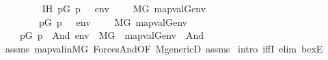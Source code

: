 \begin{isabellebody}
\ \ \ \ \isanewline
\ \ \ \ IH{\isacharcolon}{\kern0pt}\ {\isachardoublequoteopen}{\isacharparenleft}{\kern0pt}{\isasymexists}p{\isasymin}G{\isachardot}{\kern0pt}\ p\ {\isasymtturnstile}\ {\isasymphi}\ env{\isacharparenright}{\kern0pt}\ \ {\isasymlongleftrightarrow}\ \ \ M{\isacharbrackleft}{\kern0pt}G{\isacharbrackright}{\kern0pt}{\isacharcomma}{\kern0pt}\ map{\isacharparenleft}{\kern0pt}val{\isacharparenleft}{\kern0pt}G{\isacharparenright}{\kern0pt}{\isacharcomma}{\kern0pt}env{\isacharparenright}{\kern0pt}\ {\isasymTurnstile}\ {\isasymphi}{\isachardoublequoteclose}\isanewline
\ \ \ \ \ \ \ \ {\isachardoublequoteopen}{\isacharparenleft}{\kern0pt}{\isasymexists}p{\isasymin}G{\isachardot}{\kern0pt}\ p\ {\isasymtturnstile}\ {\isasympsi}\ env{\isacharparenright}{\kern0pt}\ \ {\isasymlongleftrightarrow}\ \ \ M{\isacharbrackleft}{\kern0pt}G{\isacharbrackright}{\kern0pt}{\isacharcomma}{\kern0pt}\ map{\isacharparenleft}{\kern0pt}val{\isacharparenleft}{\kern0pt}G{\isacharparenright}{\kern0pt}{\isacharcomma}{\kern0pt}env{\isacharparenright}{\kern0pt}\ {\isasymTurnstile}\ {\isasympsi}{\isachardoublequoteclose}\isanewline
\ \ \isanewline
\ \ \ \ {\isachardoublequoteopen}{\isacharparenleft}{\kern0pt}{\isasymexists}p{\isasymin}G{\isachardot}{\kern0pt}\ {\isacharparenleft}{\kern0pt}p\ {\isasymtturnstile}\ And{\isacharparenleft}{\kern0pt}{\isasymphi}{\isacharcomma}{\kern0pt}{\isasympsi}{\isacharparenright}{\kern0pt}\ env{\isacharparenright}{\kern0pt}{\isacharparenright}{\kern0pt}\ {\isasymlongleftrightarrow}\ M{\isacharbrackleft}{\kern0pt}G{\isacharbrackright}{\kern0pt}\ {\isacharcomma}{\kern0pt}\ map{\isacharparenleft}{\kern0pt}val{\isacharparenleft}{\kern0pt}G{\isacharparenright}{\kern0pt}{\isacharcomma}{\kern0pt}env{\isacharparenright}{\kern0pt}\ {\isasymTurnstile}\ And{\isacharparenleft}{\kern0pt}{\isasymphi}{\isacharcomma}{\kern0pt}{\isasympsi}{\isacharparenright}{\kern0pt}{\isachardoublequoteclose}\isanewline
%
\isadelimproof
\ \ %
\endisadelimproof
%
\isatagproof
{}\isamarkupfalse%
\ assms\ map{\isacharunderscore}{\kern0pt}val{\isacharunderscore}{\kern0pt}in{\isacharunderscore}{\kern0pt}MG\ Forces{\isacharunderscore}{\kern0pt}And{\isacharbrackleft}{\kern0pt}OF\ M{\isacharunderscore}{\kern0pt}genericD\ assms{\isacharparenleft}{\kern0pt}{}{\isacharminus}{\kern0pt}{}{\isacharparenright}{\kern0pt}{\isacharbrackright}{\kern0pt}\isanewline
{}\isamarkupfalse%
\ {\isacharparenleft}{\kern0pt}intro\ iffI{\isacharcomma}{\kern0pt}\ elim\ bexE{\isacharparenright}{\kern0pt}\isanewline
\ \ \isamarkupfalse%

\end{isabellebody}
